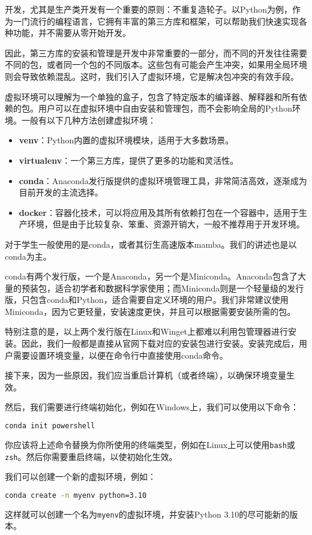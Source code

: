 \documentclass[../main.tex]{subfiles}
\begin{document}
开发，尤其是生产类开发有一个重要的原则：不重复造轮子。以Python为例，作为一门流行的编程语言，它拥有丰富的第三方库和框架，可以帮助我们快速实现各种功能，并不需要从零开始开发。

因此，第三方库的安装和管理是开发中非常重要的一部分，而不同的开发往往需要不同的包，或者同一个包的不同版本。这些包有可能会产生冲突，如果用全局环境则会导致依赖混乱。这时，我们引入了虚拟环境，它是解决包冲突的有效手段。

虚拟环境可以理解为一个单独的盒子，包含了特定版本的编译器、解释器和所有依赖的包。用户可以在虚拟环境中自由安装和管理包，而不会影响全局的Python环境。一般有以下几种方法创建虚拟环境：
\begin{itemize}
  \item \textbf{venv}：Python内置的虚拟环境模块，适用于大多数场景。
  \item \textbf{virtualenv}：一个第三方库，提供了更多的功能和灵活性。
  \item \textbf{conda}：Anaconda发行版提供的虚拟环境管理工具，非常简洁高效，逐渐成为目前开发的主流选择。
  \item \textbf{docker}：容器化技术，可以将应用及其所有依赖打包在一个容器中，适用于生产环境，但是由于比较复杂、笨重、资源开销大，一般不推荐用于开发环境。
\end{itemize}

对于学生一般使用的是conda，或者其衍生高速版本mamba。我们的讲述也是以conda为主。

conda有两个发行版，一个是Anaconda，另一个是Miniconda。Anaconda包含了大量的预装包，适合初学者和数据科学家使用；而Miniconda则是一个轻量级的发行版，只包含conda和Python，适合需要自定义环境的用户。我们非常建议使用Miniconda，因为它更轻量，安装速度更快，并且可以根据需要安装所需的包。

特别注意的是，以上两个发行版在Linux和Winget上都难以利用包管理器进行安装。因此，我们一般都是直接从官网下载对应的安装包进行安装。安装完成后，用户需要设置环境变量，以便在命令行中直接使用conda命令。

接下来，因为一些原因，我们应当重启计算机（或者终端），以确保环境变量生效。

然后，我们需要进行终端初始化，例如在Windows上，我们可以使用以下命令：
\begin{lstlisting}[language=bash]
    conda init powershell
\end{lstlisting}

你应该将上述命令替换为你所使用的终端类型，例如在Linux上可以使用\texttt{bash}或\texttt{zsh}。然后你需要重启终端，以使初始化生效。

我们可以创建一个新的虚拟环境，例如：
\begin{lstlisting}[language=bash]
    conda create -n myenv python=3.10
\end{lstlisting}
这样就可以创建一个名为\texttt{myenv}的虚拟环境，并安装Python 3.10的尽可能新的版本。
\end{document}

